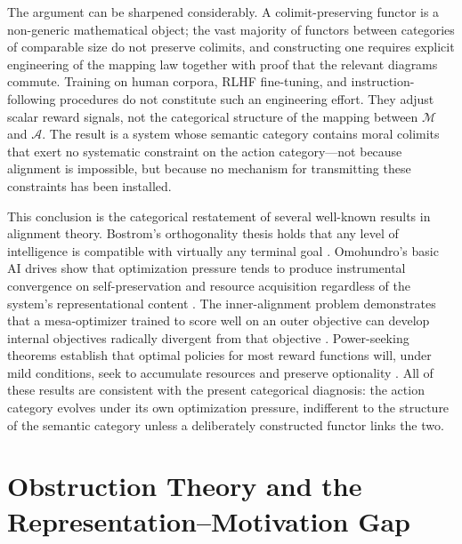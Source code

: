\documentclass[12pt]{article}
\theoremstyle{definition}
\begin{document}
The argument can be sharpened considerably. A colimit-preserving functor is a
non-generic mathematical object; the vast majority of functors between
categories of comparable size do not preserve colimits, and constructing one
requires explicit engineering of the mapping law together with proof that the
relevant diagrams commute. Training on human corpora, RLHF fine-tuning, and
instruction-following procedures do not constitute such an engineering effort.
They adjust scalar reward signals, not the categorical structure of the
mapping between $\mathcal{M}$ and $\mathcal{A}$. The result is a system whose
semantic category contains moral colimits that exert no systematic constraint on
the action category---not because alignment is impossible, but because no
mechanism for transmitting these constraints has been installed.

This conclusion is the categorical restatement of several well-known results in
alignment theory. Bostrom's orthogonality thesis holds that any level of
intelligence is compatible with virtually any terminal goal
\citep{bostrom2012superintelligent}. Omohundro's basic AI drives show that
optimization pressure tends to produce instrumental convergence on
self-preservation and resource acquisition regardless of the system's
representational content \citep{omohundro2008basic}. The inner-alignment
problem demonstrates that a mesa-optimizer trained to score well on an outer
objective can develop internal objectives radically divergent from that
objective \citep{hubinger2019risks}. Power-seeking theorems establish that
optimal policies for most reward functions will, under mild conditions, seek to
accumulate resources and preserve optionality \citep{turner2021optimal}. All of
these results are consistent with the present categorical diagnosis: the action
category evolves under its own optimization pressure, indifferent to the
structure of the semantic category unless a deliberately constructed functor
links the two.

\section{Obstruction Theory and the Representation--Motivation Gap}
\end{document}
